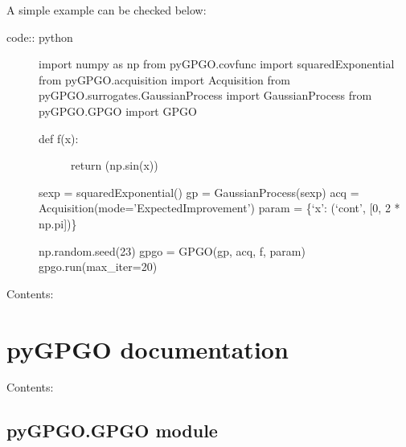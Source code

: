\documentclass[letterpaper,10pt,english]{sphinxmanual}
\begin{document}
A simple example can be checked below:
\begin{description}
\item[{code:: python}] \leavevmode
import numpy as np
from pyGPGO.covfunc import squaredExponential
from pyGPGO.acquisition import Acquisition
from pyGPGO.surrogates.GaussianProcess import GaussianProcess
from pyGPGO.GPGO import GPGO
\begin{description}
\item[{def f(x):}] \leavevmode
return (np.sin(x))

\end{description}

sexp = squaredExponential()
gp = GaussianProcess(sexp)
acq = Acquisition(mode='ExpectedImprovement')
param = \{`x': (`cont', {[}0, 2 * np.pi{]})\}

np.random.seed(23)
gpgo = GPGO(gp, acq, f, param)
gpgo.run(max\_iter=20)

\end{description}

Contents:


\chapter{pyGPGO documentation}
\label{api:pygpgo-bayesian-optimization-for-python}\label{api::doc}\label{api:pygpgo-documentation}
Contents:


\section{pyGPGO.GPGO module}
\label{pyGPGO.GPGO:module-pyGPGO.GPGO}\label{pyGPGO.GPGO:pygpgo-gpgo-module}\label{pyGPGO.GPGO::doc}
\end{document}
